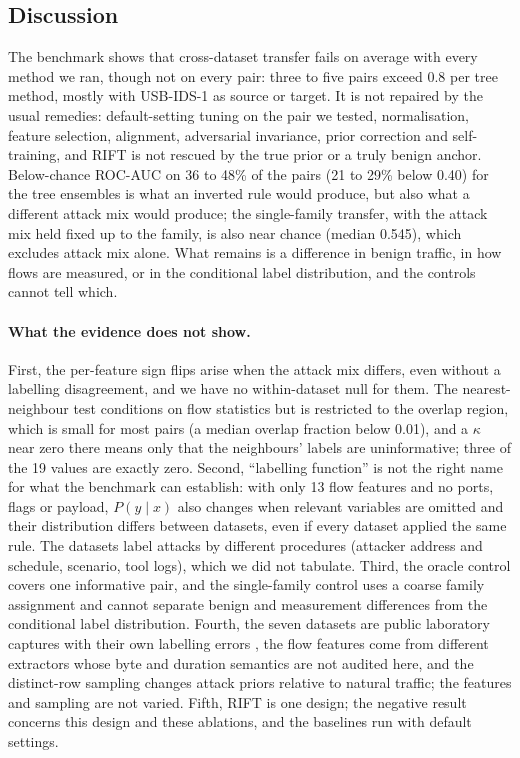 \documentclass[11pt]{article}
\begin{document}
\subsection{Discussion}
The benchmark shows that cross-dataset transfer fails on average with every method we ran, though not on every pair: three to five pairs exceed 0.8 per tree method, mostly with USB-IDS-1 as source or target.
It is not repaired by the usual remedies: default-setting tuning on the pair we tested, normalisation, feature selection, alignment, adversarial invariance, prior correction and self-training, and RIFT is not rescued by the true prior or a truly benign anchor.
Below-chance ROC-AUC on 36 to 48\% of the pairs (21 to 29\% below 0.40) for the tree ensembles is what an inverted rule would produce, but also what a different attack mix would produce; the single-family transfer, with the attack mix held fixed up to the family, is also near chance (median 0.545), which excludes attack mix alone.
What remains is a difference in benign traffic, in how flows are measured, or in the conditional label distribution, and the controls cannot tell which.

\paragraph{What the evidence does not show.}
First, the per-feature sign flips arise when the attack mix differs, even without a labelling disagreement, and we have no within-dataset null for them.
The nearest-neighbour test conditions on flow statistics but is restricted to the overlap region, which is small for most pairs (a median overlap fraction below 0.01), and a $\kappa$ near zero there means only that the neighbours' labels are uninformative; three of the 19 values are exactly zero.
Second, ``labelling function'' is not the right name for what the benchmark can establish: with only 13 flow features and no ports, flags or payload, $P(y\mid x)$ also changes when relevant variables are omitted and their distribution differs between datasets, even if every dataset applied the same rule.
The datasets label attacks by different procedures (attacker address and schedule, scenario, tool logs), which we did not tabulate.
Third, the oracle control covers one informative pair, and the single-family control uses a coarse family assignment and cannot separate benign and measurement differences from the conditional label distribution.
Fourth, the seven datasets are public laboratory captures with their own labelling errors \citep{engelen2021troubleshooting}, the flow features come from different extractors whose byte and duration semantics are not audited here, and the distinct-row sampling changes attack priors relative to natural traffic; the features and sampling are not varied.
Fifth, RIFT is one design; the negative result concerns this design and these ablations, and the baselines run with default settings.
\end{document}
